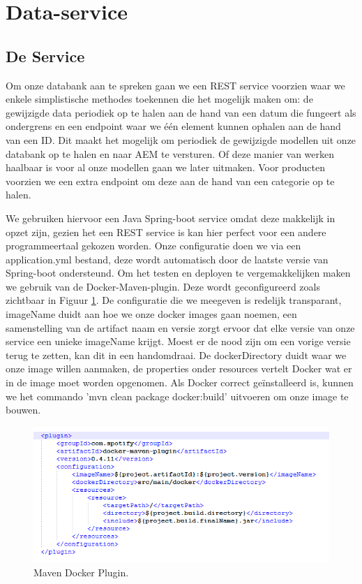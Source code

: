 \documentclass{article}
\begin{document}
	\section{Data-service}
	
	\subsection{De Service}
	Om onze databank aan te spreken gaan we een REST service voorzien waar we enkele simplistische methodes toekennen die het mogelijk maken om: de gewijzigde data periodiek op te halen aan de hand van een datum die fungeert als ondergrens en een endpoint waar we \'e\'en element kunnen ophalen aan de hand van een ID. Dit maakt het mogelijk om periodiek de gewijzigde modellen uit onze databank op te halen en naar AEM te versturen. Of deze manier van werken haalbaar is voor al onze modellen gaan we later uitmaken. Voor producten voorzien we een extra endpoint om deze aan de hand van een categorie op te halen. 
	\par
	We gebruiken hiervoor een Java Spring-boot service omdat deze makkelijk in opzet zijn, gezien het een REST service is kan hier perfect voor een andere programmeertaal gekozen worden. Onze configuratie doen we via een application.yml bestand, deze wordt automatisch door de laatste versie van Spring-boot ondersteund. Om het testen en deployen te vergemakkelijken maken we gebruik van de Docker-Maven-plugin. Deze wordt geconfigureerd zoals zichtbaar in Figuur \ref{fig:docker-plugin}. De configuratie die we meegeven is redelijk transparant, imageName duidt aan hoe we onze docker images gaan noemen, een samenstelling van de artifact naam en versie zorgt ervoor dat elke versie van onze service een unieke imageName krijgt. Moest er de nood zijn om een vorige versie terug te zetten, kan dit in een handomdraai. De dockerDirectory duidt waar we onze image willen aanmaken, de properties onder resources vertelt Docker wat er in de image moet worden opgenomen. Als Docker correct ge\"installeerd is, kunnen we het commando 'mvn clean package docker:build' uitvoeren om onze image te bouwen.
	
	\begin{figure}[h!]
		\centering
  		\includegraphics[width=\linewidth]{images/maven-plugin.PNG}
  		\caption{Maven Docker Plugin.}
  		\label{fig:docker-plugin}
	\end{figure}
\end{document}
